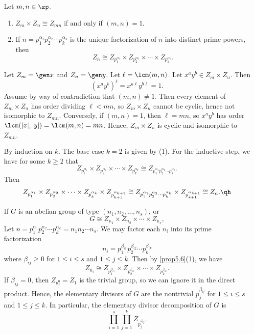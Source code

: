 \begin{prop}
    \label{prop5.6}
    Let $m, n \in \zp$.
    \begin{enumerate}
        \item $Z_m \times Z_n \cong Z_{mn}$ if and only if $(m, n) = 1$.
        \item If $n = p_1^{\alpha_1} p_2^{\alpha_2} \cdots p_k^{\alpha_k}$ is the unique factorization of $n$ into distinct prime powers, then
        \[Z_n \cong Z_{p_1^{\alpha_1}} \times Z_{p_2^{\alpha_2}} \times \cdots \times Z_{p_k^{\alpha_k}}.\]
    \end{enumerate}
    \begin{proofnum}
        \item Let $Z_m = \gen x$ and $Z_n = \gen y$. Let $\ell = \lcm(m, n)$. Let $x^ay^b \in Z_m \times Z_n$. Then
        \[(x^ay^b)^\ell = x^{a\ell}y^{b\ell} = 1.\]
        Assume by way of contradiction that $(m, n) \neq 1$. Then every element of $Z_m \times Z_n$ has order dividing $\ell < mn$, so $Z_m \times Z_n$ cannot be cyclic, hence not isomorphic to $Z_{mn}$. Conversely, if $(m, n) = 1$, then $\ell = mn$, so $x^ay^b$ has order $\lcm(|x|, |y|) = \lcm(m, n) = mn$. Hence, $Z_m \times Z_n$ is cyclic and isomorphic to $Z_{mn}$.
        \item By induction on $k$. The base case $k = 2$ is given by (1). For the inductive step, we have for some $k \geq 2$ that
        \[Z_{p_1^{\alpha_1}} \times Z_{p_2^{\alpha_2}} \times \cdots \times Z_{p_k^{\alpha_k}} \cong Z_{p_1^{\alpha_1} p_2^{\alpha_2} \cdots p_k^{\alpha_k}}.\] Then
        \[Z_{p_1^{\alpha_1}} \times Z_{p_2^{\alpha_2}} \times \cdots \times Z_{p_k^{\alpha_k}} \times Z_{p_{k + 1}^{\alpha_{k + 1}}} \cong Z_{p_1^{\alpha_1} p_2^{\alpha_2} \cdots p_k^{\alpha_k}} \times Z_{p_{k + 1}^{\alpha_{k + 1}}} \cong Z_n.\qh\]
    \end{proofnum}
\end{prop}

\begin{ex}
    If $G$ is an abelian group of type $(n_1, n_2, \ldots, n_s)$, or
    \[G \cong Z_{n_1} \times Z_{n_2} \times \cdots \times Z_{n_s},\]
    Let $n = p_1^{\alpha_1} p_2^{\alpha_2} \cdots p_k^{\alpha_k} = n_1 n_2 \cdots n_s$. We may factor each $n_i$ into its prime factorization
    \[n_i = p_1^{\beta_{i1}} p_2^{\beta_{i2}} \cdots p_k^{\beta_{ik}}\]
    where $\beta_{ij} \geq 0$ for $1 \leq i \leq s$ and $1 \leq j \leq k$. Then by \autoref{prop5.6}(1), we have
    \[Z_{n_i} \cong Z_{p_1^{\beta_{i1}}} \times Z_{p_2^{\beta_{i2}}} \times \cdots \times Z_{p_k^{\beta_{ik}}}.\]
    If $\beta_{ij} = 0$, then $Z_{p_j^0} = Z_1$ is the trivial group, so we can ignore it in the direct product. Hence, the elementary divisors of $G$ are the nontrivial $p_j^{\beta_{ij}}$ for $1 \leq i \leq s$ and $1 \leq j \leq k$. In particular, the elementary divisor decomposition of $G$ is
    \[\prod_{i = 1}^s \prod_{j = 1}^k Z_{p_j^{\beta_{ij}}}.\]
\end{ex}


